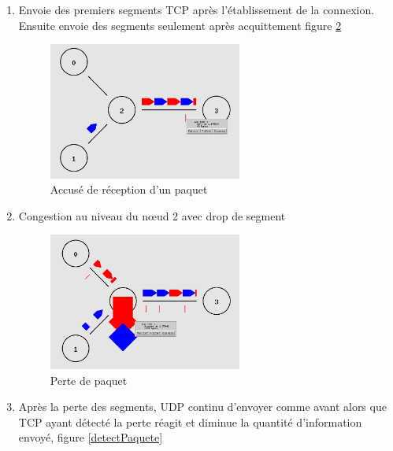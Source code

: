 \documentclass[11pt]{article}
\begin{document}
\begin{enumerate}
	\item Envoie des premiers segments TCP après l’établissement de la connexion. Ensuite envoie des segments seulement après acquittement figure \ref{acuseRecep}

\begin{figure}[H]
	\begin{center}
		\includegraphics[width=0.6\textwidth]{assets/tp1/acuseReceptionPaquet.png}
	\end{center}
	\caption{Accusé de réception d'un paquet}
	\label{acuseRecep}
\end{figure}
	
	\item Congestion au niveau du nœud 2 avec drop de segment
	
\begin{figure}[H]
	\begin{center}
		\includegraphics[width=0.6\textwidth]{assets/tp1/dropDePaquet.png}
	\end{center}
	\caption{Perte de paquet}
	\label{acuseRecep}
\end{figure}
	
	\item Après la perte des segments, UDP continu d'envoyer comme avant alors que TCP ayant détecté la perte 	réagit et diminue la quantité d’information envoyé, figure \ref{detectPaquete}


\end{enumerate}
\end{document}
